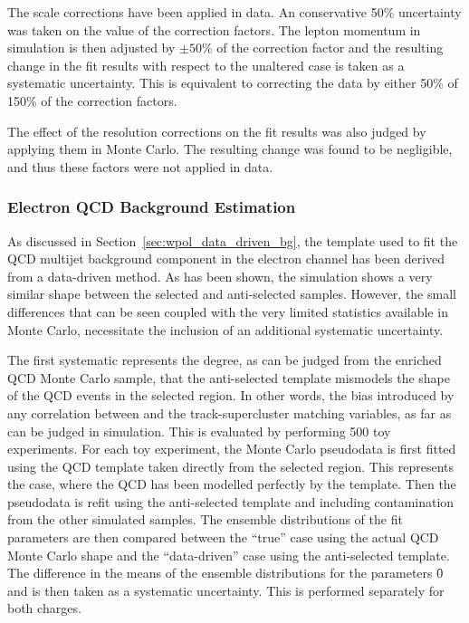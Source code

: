 The scale corrections have been applied in data. An conservative 50\%
uncertainty was taken on the value of the correction factors. The lepton
momentum in simulation is then adjusted by $\pm 50\%$ of the correction factor
and the resulting change in the fit results with respect to the unaltered case
is taken as a systematic uncertainty. This is equivalent to correcting the data
by either 50\% of 150\% of the correction factors.

The effect of the resolution corrections on the fit results was also judged by
applying them in Monte Carlo. The resulting change was found to be negligible,
and thus these factors were not applied in data.

\subsubsection{Electron \ac{QCD} Background Estimation}
\label{sec:wpol_syst_ele_bgest}
As discussed in Section~\ref{sec:wpol_data_driven_bg}, the template used to fit
the \ac{QCD} multijet background component in the electron channel has been
derived from a data-driven method. As has been shown, the simulation shows a
very similar \LP shape between the selected and anti-selected samples. However,
the small differences that can be seen coupled with the very limited statistics
available in Monte Carlo, necessitate the inclusion of an additional systematic
uncertainty.

The first systematic represents the degree, as can be judged from the enriched
\ac{QCD} Monte Carlo sample, that the anti-selected template mismodels the \LP
shape of the \ac{QCD} events in the selected region. In other words, the bias
introduced by any correlation between \LP and the track-supercluster matching
variables, as far as can be judged in simulation. This is evaluated by
performing 500 toy experiments. For each toy experiment, the Monte Carlo
pseudodata is first fitted using the \ac{QCD} template taken directly from the
selected region. This represents the case, where the \ac{QCD} has been modelled
perfectly by the template. Then the pseudodata is refit using the anti-selected
template and including contamination from the other simulated samples. The
ensemble distributions of the fit parameters are then compared between the
``true'' case using the actual \ac{QCD} Monte Carlo shape and the
``data-driven'' case using the anti-selected template. The difference in the
means of the ensemble distributions for the parameters \f0 and \fLmfR is then
taken as a systematic uncertainty. This is performed separately for both
charges.

